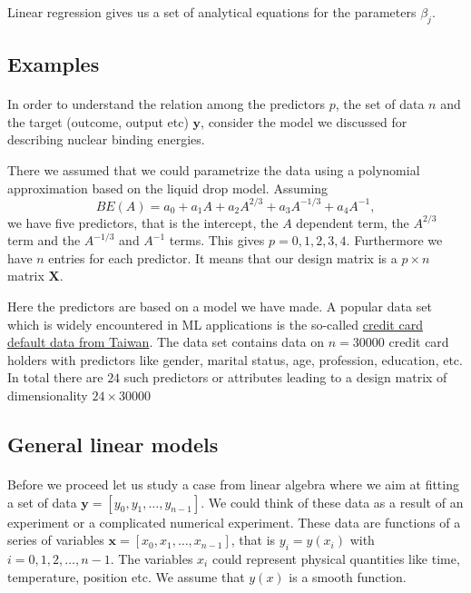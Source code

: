 \documentclass[%
oneside,                 %
final,                   %
10pt]{article}
\begin{document}
Linear regression gives us a set of analytical equations for the parameters $\beta_j$.





\subsection{Examples}

\paragraph{}
In order to understand the relation among the predictors $p$, the set of data $n$ and the target (outcome, output etc) $\bm{y}$,
consider the model we discussed for describing nuclear binding energies. 

There we assumed that we could parametrize the data using a polynomial approximation based on the liquid drop model.
Assuming 
\[
BE(A) = a_0+a_1A+a_2A^{2/3}+a_3A^{-1/3}+a_4A^{-1},
\]
we have five predictors, that is the intercept, the $A$ dependent term, the $A^{2/3}$ term and the $A^{-1/3}$ and $A^{-1}$ terms.
This gives $p=0,1,2,3,4$. Furthermore we have $n$ entries for each predictor. It means that our design matrix is a 
$p\times n$ matrix $\bm{X}$.

Here the predictors are based on a model we have made. A popular data set which is widely encountered in ML applications is the
so-called \href{{https://www.sciencedirect.com/science/article/pii/S0957417407006719?via%







\subsection{General linear models}

\paragraph{}
Before we proceed let us study a case from linear algebra where we aim at fitting a set of data $\bm{y}=[y_0,y_1,\dots,y_{n-1}]$. We could think of these data as a result of an experiment or a complicated numerical experiment. These data are functions of a series of variables $\bm{x}=[x_0,x_1,\dots,x_{n-1}]$, that is $y_i = y(x_i)$ with $i=0,1,2,\dots,n-1$. The variables $x_i$ could represent physical quantities like time, temperature, position etc. We assume that $y(x)$ is a smooth function. 
\end{document}
